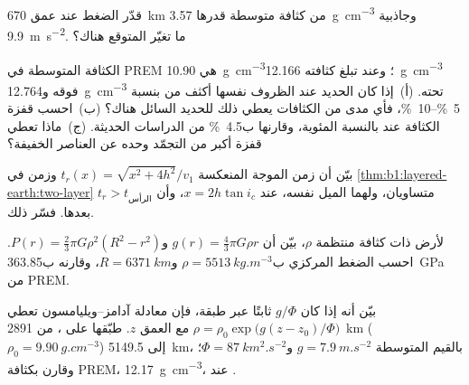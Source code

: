 \begin{exercise}[$\star\star$]\label{exo:b1:layered-earth:8}
قدّر الضغط عند عمق \qty{670}{km} من كثافة متوسطة قدرها \qty{3.57}{g.cm^{-3}} وجاذبية \qty{9.9}{m.s^{-2}}. ما تغيّر  المتوقع هناك؟
\end{exercise}

\begin{exercise}[$\star\star$]\label{exo:b1:layered-earth:9}
الكثافة المتوسطة  في PREM هي \qty{10.90}{g.cm^{-3}}؛ وعند  تبلغ كثافته \qty{12.166}{g.cm^{-3}} فوقه و\qty{12.764}{g.cm^{-3}} تحته. (أ)~إذا كان الحديد عند الظروف نفسها أكثف من  بنسبة \qtyrange{5}{10}{\percent}، فأي مدى من الكثافات يعطي ذلك للحديد السائل هناك؟ (ب)~احسب قفزة الكثافة عند  بالنسبة المئوية، وقارنها ب\qty{4.5}{\percent} من الدراسات الحديثة. (ج)~ماذا تعطي قفزة أكبر من التجمّد وحده عن العناصر الخفيفة؟
\end{exercise}

\begin{exercise}[$\star\star\star$]\label{exo:b1:layered-earth:10}
بيّن أن زمن الموجة المنعكسة $t_r(x) = \sqrt{x^2 + 4h^2}/v_1$ وزمن  في \cref{thm:b1:layered-earth:two-layer} متساويان، ولهما الميل نفسه، عند $x = 2h\tan i_c$، وأن $t_r > t_{\text{الرأس}}$ بعدها. فسّر ذلك.
\end{exercise}

\begin{exercise}[$\star\star\star$]\label{exo:b1:layered-earth:11}
لأرض ذات كثافة منتظمة $\rho$، بيّن أن $g(r) = \tfrac43\pi G\rho r$ و$P(r) = \tfrac23\pi G\rho^2(R^2 - r^2)$. احسب الضغط المركزي ب$\rho = \qty{5513}{kg.m^{-3}}$ و$R = \qty{6371}{km}$، وقارنه ب\qty{363.85}{GPa} من PREM.
\end{exercise}

\begin{exercise}[$\star\star\star$]\label{exo:b1:layered-earth:12}
بيّن أنه إذا كان $g/\Phi$ ثابتًا عبر طبقة، فإن معادلة آدامز–ويليامسون تعطي $\rho = \rho_0\exp\bigl(g(z - z_0)/\Phi\bigr)$ مع العمق $z$. طبّقها على ، من \qty{2891}{km} ($\rho_0 =
\qty{9.90}{g.cm^{-3}}$) إلى \qty{5149.5}{km}، بالقيم المتوسطة $g = \qty{7.9}{m.s^{-2}}$ و$\Phi = \qty{87}{km^2.s^{-2}}$؛ وقارن بكثافة PREM، \qty{12.17}{g.cm^{-3}}، عند .
\end{exercise}

